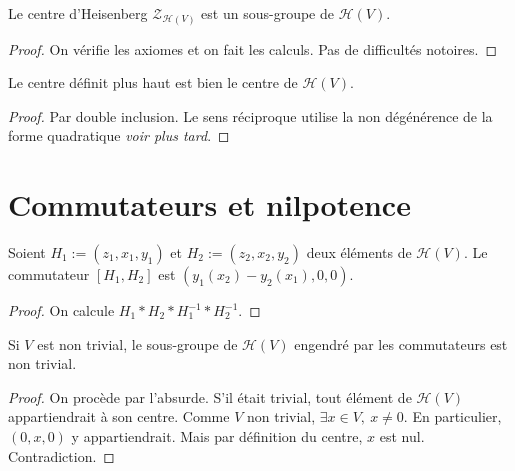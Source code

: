\begin{proposition}
    \label{prop:center_H_subgroup}
    \leanok

    Le centre d'Heisenberg $\mathcal{Z}_{\mathcal{H}(V)}$ est un sous-groupe
    de $\mathcal{H}(V)$.
    \begin{proof}
    On vérifie les axiomes et on fait les calculs. Pas de difficultés notoires.
    \end{proof}
\end{proposition}

\begin{proposition}
    \label{prop:center_H_is_center}
    \leanok

    Le centre définit plus haut est bien le centre de $\mathcal{H}(V)$.
    \begin{proof}
        Par double inclusion. Le sens réciproque utilise la non dégénérence de la forme
        quadratique \textit{voir plus tard}.
    \end{proof}
\end{proposition}

\section{Commutateurs et nilpotence}

\begin{proposition}[Commutateur]
    \label{prop:commutator_H_of_elements}
    \leanok 

    Soient $H_1:=(z_1,x_1,y_1)$ et $H_2:=(z_2,x_2,y_2)$ deux éléments de 
    $\mathcal{H}(V)$. Le commutateur $[H_1,H_2]$ est $(y_1(x_2)-y_2(x_1),0,0)$.
    \begin{proof}
        On calcule $H_1*H_2*H_1^{-1}*H_2^{-1}$.
    \end{proof}
\end{proposition}

\begin{proposition}
    \label{prop:commutator_H_nontrivial}
    \leanok 

    Si $V$ est non trivial, le sous-groupe de $\mathcal{H}(V)$ engendré par les commutateurs est non trivial.
    \begin{proof}
        On procède par l'absurde. S'il était trivial, tout élément de $\mathcal{H}(V)$
        appartiendrait à son centre.
        Comme $V$ non trivial, $\exists x\in V,\ x\ne0$. En particulier,
        $(0,x,0)$ y appartiendrait. Mais par définition du centre, $x$ est nul. Contradiction.
    \end{proof}
\end{proposition}

